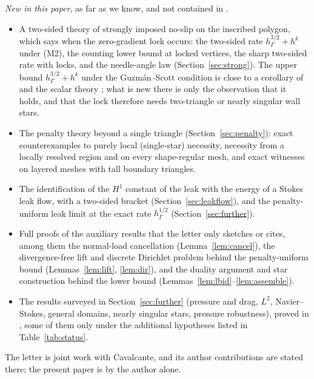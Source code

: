 \documentclass[pdflatex,sn-mathphys-num]{sn-jnl}
\theoremstyle{thmstyleone}
\theoremstyle{thmstylethree}
\newcommand{\hG}{h_\Gamma}
\begin{document}
\emph{New in this paper}, as far as we know, and not contained in \cite{CavalcantePadhiLetter}.
\begin{itemize}
\item A two-sided theory of strongly imposed no-slip on the inscribed polygon, which says when the zero-gradient lock occurs: the two-sided rate $\hG^{3/2}+h^k$ under (M2), the counting lower bound at locked vertices, the sharp two-sided rate with locks, and the needle-angle law (Section~\ref{sec:strong}). The upper bound $\hG^{3/2}+h^k$ under the Guzm\'an--Scott condition is close to a corollary of \cite{GuzmanScott2019} and the scalar theory \cite{BergerScottStrang1972,Scott1975}; what is new there is only the observation that it holds, and that the lock therefore needs two-triangle or nearly singular wall stars.
\item The penalty theory beyond a single triangle (Section~\ref{sec:penalty}): exact counterexamples to purely local (single-star) necessity, necessity from a locally resolved region and on every shape-regular mesh, and exact witnesses on layered meshes with tall boundary triangles.
\item The identification of the $H^1$ constant of the leak with the energy of a Stokes leak flow, with a two-sided bracket (Section~\ref{sec:leakflow}), and the penalty-uniform leak limit at the exact rate $\hG^{1/2}$ (Section~\ref{sec:further}).
\item Full proofs of the auxiliary results that the letter only sketches or cites, among them the normal-load cancellation (Lemma~\ref{lem:cancel}), the divergence-free lift and discrete Dirichlet problem behind the penalty-uniform bound (Lemmas~\ref{lem:lift}, \ref{lem:dir}), and the duality argument and star construction behind the lower bound (Lemmas~\ref{lem:lbid}--\ref{lem:assemble}).
\item The results surveyed in Section~\ref{sec:further} (pressure and drag, $L^2$, Navier--Stokes, general domains, nearly singular stars, pressure robustness), proved in \cite{PadhiExt}, some of them only under the additional hypotheses listed in Table~\ref{tab:status}.
\end{itemize}
The letter is joint work with Cavalcante, and its author contributions are stated there; the present paper is by the author alone.

\end{document}
